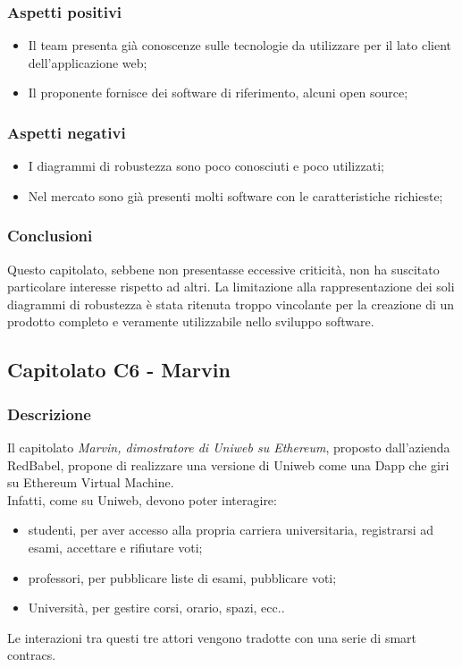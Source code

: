 		\subsubsection{Aspetti positivi}
		\begin{itemize}
			\item Il team presenta già conoscenze sulle tecnologie da utilizzare per il lato client dell'applicazione web;
			\item Il proponente fornisce dei software di riferimento, alcuni open source;
		\end{itemize}
		\subsubsection{Aspetti negativi}
		\begin{itemize}
			\item I diagrammi di robustezza sono poco conosciuti e poco utilizzati;
			\item Nel mercato sono già presenti molti software con le caratteristiche richieste;
		\end{itemize}
		\subsubsection{Conclusioni}
		Questo capitolato, sebbene non presentasse eccessive criticità, non ha suscitato particolare interesse rispetto ad altri. La limitazione alla rappresentazione dei soli diagrammi di robustezza è stata ritenuta troppo vincolante per la creazione di un prodotto completo e veramente utilizzabile nello sviluppo software.
		
		
	\subsection{Capitolato C6 - Marvin}
		\subsubsection{Descrizione}
		Il capitolato \emph{Marvin, dimostratore di Uniweb su Ethereum}, proposto dall'azienda RedBabel, propone di realizzare una versione di Uniweb come una Dapp che giri su Ethereum Virtual Machine. \\  Infatti, come su Uniweb, devono poter interagire:
		\begin{itemize} 
			\item studenti, per aver accesso alla propria carriera universitaria, registrarsi ad esami, accettare e rifiutare voti; 
			\item professori, per pubblicare liste di esami, pubblicare voti;
			\item Università, per gestire corsi, orario, spazi, ecc..
		\end{itemize}
	 	Le interazioni tra questi tre attori vengono tradotte con una serie di smart contracs.
